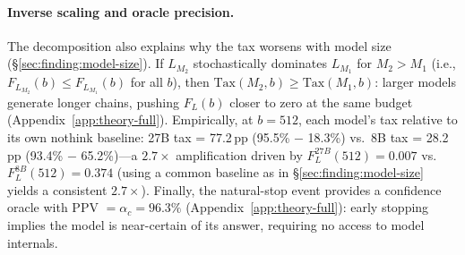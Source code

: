 \paragraph{Inverse scaling and oracle precision.}
The decomposition also explains why the tax worsens with model size (\S\ref{sec:finding:model-size}).
If $L_{M_2}$ stochastically dominates $L_{M_1}$ for $M_2 > M_1$ (i.e., $F_{L_{M_2}}(b) \le F_{L_{M_1}}(b)$ for all $b$), then $\mathrm{Tax}(M_2, b) \ge \mathrm{Tax}(M_1, b)$: larger models generate longer chains, pushing $F_L(b)$ closer to zero at the same budget (Appendix~\ref{app:theory-full}).
Empirically, at $b{=}512$, each model's tax relative to its own nothink baseline: 27B tax = 77.2\,pp (95.5\% $-$ 18.3\%) vs.\ 8B tax = 28.2\,pp (93.4\% $-$ 65.2\%)---a $2.7\times$ amplification driven by $F_L^{27B}(512) = 0.007$ vs.\ $F_L^{8B}(512) = 0.374$ (using a common baseline as in \S\ref{sec:finding:model-size} yields a consistent $2.7\times$).
Finally, the natural-stop event provides a confidence oracle with PPV $= \alpha_c = 96.3\%$ (Appendix~\ref{app:theory-full}): early stopping implies the model is near-certain of its answer, requiring no access to model internals.

